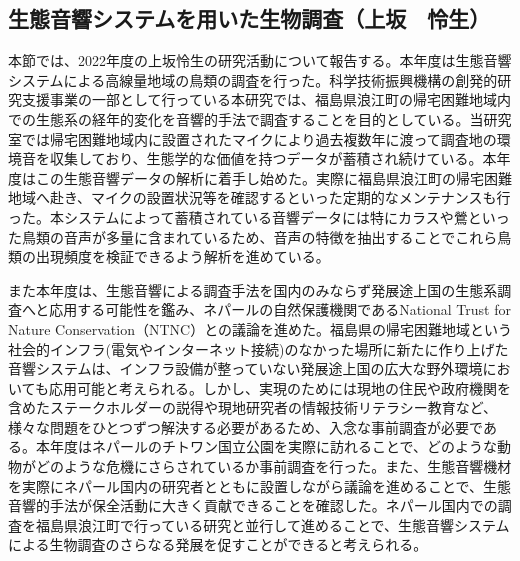 \subsection{生態音響システムを用いた生物調査（上坂　怜生）}

本節では、2022年度の上坂怜生の研究活動について報告する。本年度は生態音響システムによる高線量地域の鳥類の調査を行った。科学技術振興機構の創発的研究支援事業の一部として行っている本研究では、福島県浪江町の帰宅困難地域内での生態系の経年的変化を音響的手法で調査することを目的としている。当研究室では帰宅困難地域内に設置されたマイクにより過去複数年に渡って調査地の環境音を収集しており、生態学的な価値を持つデータが蓄積され続けている。本年度はこの生態音響データの解析に着手し始めた。実際に福島県浪江町の帰宅困難地域へ赴き、マイクの設置状況等を確認するといった定期的なメンテナンスも行った。本システムによって蓄積されている音響データには特にカラスや鶯といった鳥類の音声が多量に含まれているため、音声の特徴を抽出することでこれら鳥類の出現頻度を検証できるよう解析を進めている。

また本年度は、生態音響による調査手法を国内のみならず発展途上国の生態系調査へと応用する可能性を鑑み、ネパールの自然保護機関であるNational Trust for Nature Conservation（NTNC）との議論を進めた。福島県の帰宅困難地域という社会的インフラ(電気やインターネット接続)のなかった場所に新たに作り上げた音響システムは、インフラ設備が整っていない発展途上国の広大な野外環境においても応用可能と考えられる。しかし、実現のためには現地の住民や政府機関を含めたステークホルダーの説得や現地研究者の情報技術リテラシー教育など、様々な問題をひとつずつ解決する必要があるため、入念な事前調査が必要である。本年度はネパールのチトワン国立公園を実際に訪れることで、どのような動物がどのような危機にさらされているか事前調査を行った。また、生態音響機材を実際にネパール国内の研究者とともに設置しながら議論を進めることで、生態音響的手法が保全活動に大きく貢献できることを確認した。ネパール国内での調査を福島県浪江町で行っている研究と並行して進めることで、生態音響システムによる生物調査のさらなる発展を促すことができると考えられる。
 